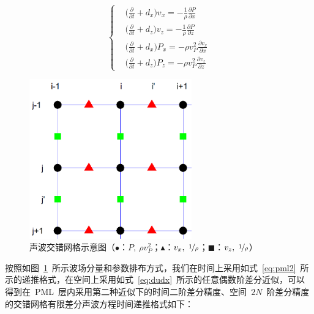 \documentclass[UTF8]{ctexart}
\begin{document}
\begin{equation}
\left\{ \begin{aligned}
& \big(\frac{\partial}{\partial t}+d_x\big)v_x=-\frac{1}{\rho}\frac{\partial P}{\partial x} \\
& \big(\frac{\partial}{\partial t}+d_z\big)v_z=-\frac{1}{\rho}\frac{\partial P}{\partial z} \\
& \big(\frac{\partial}{\partial t}+d_x\big)P_x=-\rho v_P^2\frac{\partial v_x}{\partial x} \\
& \big(\frac{\partial}{\partial t}+d_z\big)P_z=-\rho v_P^2\frac{\partial v_z}{\partial z}
\end{aligned} \right.
\end{equation}\par
\begin{figure}[t]
  \centering
  \includegraphics[width=70mm]{./Figure/asg.png}
  \caption{声波交错网格示意图（$\bullet$：$P,~\rho v_P^2$；{\color{red}$\blacktriangle$}：$v_x,~\nicefrac{1}{\rho}$；{\color{green}$\blacksquare$}：$v_z,~\nicefrac{1}{\rho}$）}\label{fig:asg}
\end{figure}
按照如图~\ref{fig:asg}~所示波场分量和参数排布方式，我们在时间上采用如式~\eqref{eq:pml2}~所示的递推格式，在空间上采用如式~\eqref{eq:dudx}~所示的任意偶数阶差分近似，可以得到在~PML~层内采用第二种近似下的时间二阶差分精度、空间~$2N$~阶差分精度的交错网格有限差分声波方程时间递推格式如下：
\end{document}
